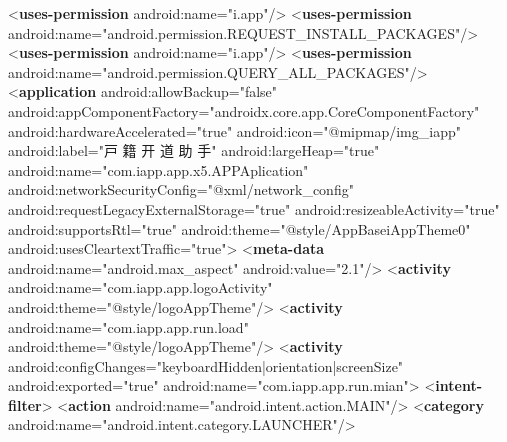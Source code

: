 \documentclass[
]{article}
\newenvironment{Shaded}{}{}
\newcommand{\KeywordTok}[1]{\textcolor[rgb]{0.00,0.44,0.13}{\textbf{#1}}}
\newcommand{\NormalTok}[1]{#1}
\newcommand{\OtherTok}[1]{\textcolor[rgb]{0.00,0.44,0.13}{#1}}
\newcommand{\StringTok}[1]{\textcolor[rgb]{0.25,0.44,0.63}{#1}}
\begin{document}
\begin{Shaded}
\begin{Highlighting}[]
\NormalTok{    \textless{}}\KeywordTok{uses{-}permission}\OtherTok{ android:name=}\StringTok{"i.app"}\NormalTok{/\textgreater{}}
\NormalTok{    \textless{}}\KeywordTok{uses{-}permission}\OtherTok{ android:name=}\StringTok{"android.permission.REQUEST\_INSTALL\_PACKAGES"}\NormalTok{/\textgreater{}}
\NormalTok{    \textless{}}\KeywordTok{uses{-}permission}\OtherTok{ android:name=}\StringTok{"i.app"}\NormalTok{/\textgreater{}}
\NormalTok{    \textless{}}\KeywordTok{uses{-}permission}\OtherTok{ android:name=}\StringTok{"android.permission.QUERY\_ALL\_PACKAGES"}\NormalTok{/\textgreater{}}
\NormalTok{    \textless{}}\KeywordTok{application}\OtherTok{ android:allowBackup=}\StringTok{"false"}\OtherTok{ android:appComponentFactory=}\StringTok{"androidx.core.app.CoreComponentFactory"}\OtherTok{ android:hardwareAccelerated=}\StringTok{"true"}\OtherTok{ android:icon=}\StringTok{"@mipmap/img\_iapp"}\OtherTok{ android:label=}\StringTok{"戸 籍 开 道 助 手"}\OtherTok{ android:largeHeap=}\StringTok{"true"}\OtherTok{ android:name=}\StringTok{"com.iapp.app.x5.APPAplication"}\OtherTok{ android:networkSecurityConfig=}\StringTok{"@xml/network\_config"}\OtherTok{ android:requestLegacyExternalStorage=}\StringTok{"true"}\OtherTok{ android:resizeableActivity=}\StringTok{"true"}\OtherTok{ android:supportsRtl=}\StringTok{"true"}\OtherTok{ android:theme=}\StringTok{"@style/AppBaseiAppTheme0"}\OtherTok{ android:usesCleartextTraffic=}\StringTok{"true"}\NormalTok{\textgreater{}}
\NormalTok{        \textless{}}\KeywordTok{meta{-}data}\OtherTok{ android:name=}\StringTok{"android.max\_aspect"}\OtherTok{ android:value=}\StringTok{"2.1"}\NormalTok{/\textgreater{}}
\NormalTok{        \textless{}}\KeywordTok{activity}\OtherTok{ android:name=}\StringTok{"com.iapp.app.logoActivity"}\OtherTok{ android:theme=}\StringTok{"@style/logoAppTheme"}\NormalTok{/\textgreater{}}
\NormalTok{        \textless{}}\KeywordTok{activity}\OtherTok{ android:name=}\StringTok{"com.iapp.app.run.load"}\OtherTok{ android:theme=}\StringTok{"@style/logoAppTheme"}\NormalTok{/\textgreater{}}
\NormalTok{        \textless{}}\KeywordTok{activity}\OtherTok{ android:configChanges=}\StringTok{"keyboardHidden|orientation|screenSize"}\OtherTok{ android:exported=}\StringTok{"true"}\OtherTok{ android:name=}\StringTok{"com.iapp.app.run.mian"}\NormalTok{\textgreater{}}
\NormalTok{            \textless{}}\KeywordTok{intent{-}filter}\NormalTok{\textgreater{}}
\NormalTok{                \textless{}}\KeywordTok{action}\OtherTok{ android:name=}\StringTok{"android.intent.action.MAIN"}\NormalTok{/\textgreater{}}
\NormalTok{                \textless{}}\KeywordTok{category}\OtherTok{ android:name=}\StringTok{"android.intent.category.LAUNCHER"}\NormalTok{/\textgreater{}}

\end{Highlighting}
\end{Shaded}
\end{document}
